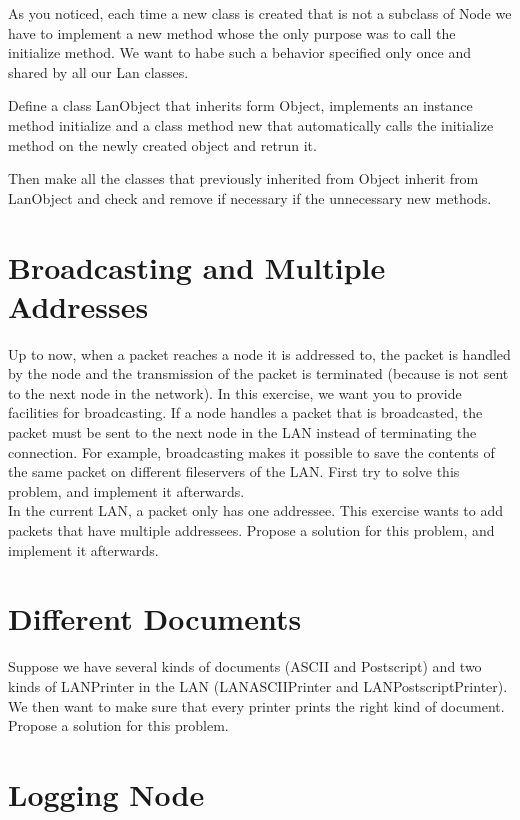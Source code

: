 As you noticed, each time a new class is created that is not 
a subclass of Node we have to implement a new method whose the 
only purpose was to call the initialize method. We want to habe 
such a behavior specified only once and shared by all our Lan 
classes. 

Define a class LanObject that inherits form Object, implements 
an instance method initialize and a class method new that automatically 
calls the initialize method on the newly created object and retrun 
it. 

Then make all the classes that previously inherited from Object 
inherit from LanObject and check and remove if necessary if the 
unnecessary new methods. 



\section{Broadcasting and Multiple Addresses}

Up to now, when a packet reaches a node it is addressed to, the 
packet is handled by the node and the transmission of the packet 
is terminated (because is not sent to the next node in the network). 
In this exercise, we want you to provide facilities for broadcasting. 
If a node handles a packet that is broadcasted, the packet must 
be sent to the next node in the LAN instead of terminating the 
connection. For example, broadcasting makes it possible to save 
the contents of the same packet on different fileservers of the 
LAN. First try to solve this problem, and implement it afterwards.\\
 In the current LAN, a packet only has one addressee. This exercise 
wants to add packets that have multiple addressees. Propose a 
solution for this problem, and implement it afterwards.



\section{Different Documents}


Suppose we have several kinds of documents (ASCII and Postscript) 
and two kinds of LANPrinter in the LAN (LANASCIIPrinter and LANPostscriptPrinter). 
We then want to make sure that every printer prints the right 
kind of document. Propose a solution for this problem.



\section{Logging Node}

